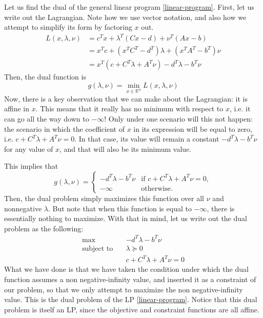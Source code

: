 \documentclass[a4paper]{article}
\theoremstyle{definition}
\begin{document}
Let us find the dual of the general linear program \eqref{linear-program}.
First, let us write out the Lagrangian.
Note how we use vector notation, and also how we attempt to simplify its form by factoring $x$ out.
\begin{align*}
	L(x, \lambda, \nu) & = c^T x + \lambda^T (Cx - d) + \nu^T (Ax - b) \\
	& = x^T c + (x^T C^T - d^T) \lambda + (x^T A^T - b^T) \nu \\
	& = x^T (c + C^T \lambda + A^T \nu) - d^T \lambda - b^T \nu
\end{align*}
Then, the dual function is
\begin{equation*}
	g(\lambda, \nu) = \min_{x \in \mathbb{R}^n} L(x, \lambda, \nu)
\end{equation*}
Now, there is a key observation that we can make about the Lagrangian: it is affine in $x$.
This means that it really has no minimum with respect to $x$, i.e. it can go all the way down to $-\infty$!
Only under one scenario will this not happen: the scenario in which the coefficient of $x$ in its expression will be equal to zero, i.e. $c + C^T \lambda + A^T \nu = 0$.
In that case, its value will remain a constant $- d^T \lambda - b^T \nu$ for any value of $x$, and that will also be its minimum value.

This implies that
\begin{equation*}
	g(\lambda, \nu) = \begin{cases}
		- d^T \lambda - b^T \nu & \text{if } c + C^T \lambda + A^T \nu = 0, \\
		-\infty & \text{otherwise.}
	\end{cases}
\end{equation*}
Then, the dual problem simply maximizes this function over all $\nu$ and nonnegative $\lambda$.
But note that when this function is equal to $-\infty$, there is essentially nothing to maximize.
With that in mind, let us write out the dual problem as the following:
\begin{align*}
	\max \quad & - d^T \lambda - b^T \nu \\
	\text{subject to} \quad & \lambda \succeq 0 \\
	& c + C^T \lambda + A^T \nu = 0
\end{align*}
What we have done is that we have taken the condition under which the dual function assumes a non negative-infinity value, and inserted it as a constraint of our problem, so that we only attempt to maximize the non negative-infinity value.
This is the dual problem of the LP \eqref{linear-program}.
Notice that this dual problem is itself an LP, since the objective and constraint functions are all affine.
\end{document}
